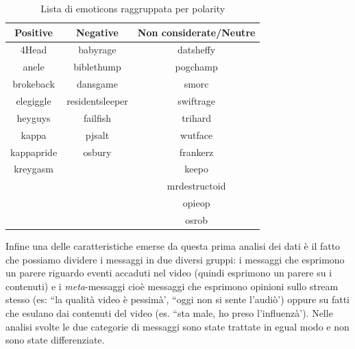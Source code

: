\documentclass[a4paper,12pt,openright,twoside]{report}
\theoremstyle{definition}
\begin{document}
\begin{table}[h]
\begin{center}
\begin{tabular}{|c|c|c|}
\hline
Positive & Negative & Non considerate/Neutre \\
\hline
4Head & babyrage & datsheffy \\
\hline
anele &  biblethump &  pogchamp \\
\hline
brokeback &  dansgame & smorc \\
\hline
elegiggle & residentsleeper &  swiftrage \\
\hline
heyguys & failfish & trihard \\
\hline
kappa & pjsalt & wutface \\
\hline
kappapride & osbury & frankerz \\
\hline
kreygasm &  & keepo \\
\hline
 & & mrdestructoid \\
\hline
& & opieop \\
\hline
& & osrob \\
\hline
\end{tabular}
\end{center}
\caption{Lista di emoticons raggruppata per polarity}
\label{tab:emoticons2}
\end{table}

Infine una delle caratteristiche emerse da questa prima analisi dei dati è il fatto che possiamo dividere i messaggi in due diversi gruppi: i messaggi che esprimono un parere
riguardo eventi accaduti nel video (quindi esprimono un parere su i contenuti) e i \emph{meta}-messaggi cioè messaggi che esprimono opinioni sullo stream stesso (es: ``la qualità video
è pessimà', ``oggi non si sente l'audiò') oppure su fatti che esulano dai contenuti del video (es. ``sta male, ho preso l'influenzà'). Nelle analisi svolte le due categorie
di messaggi sono state trattate in egual modo e non sono state differenziate.
  
\end{document}

